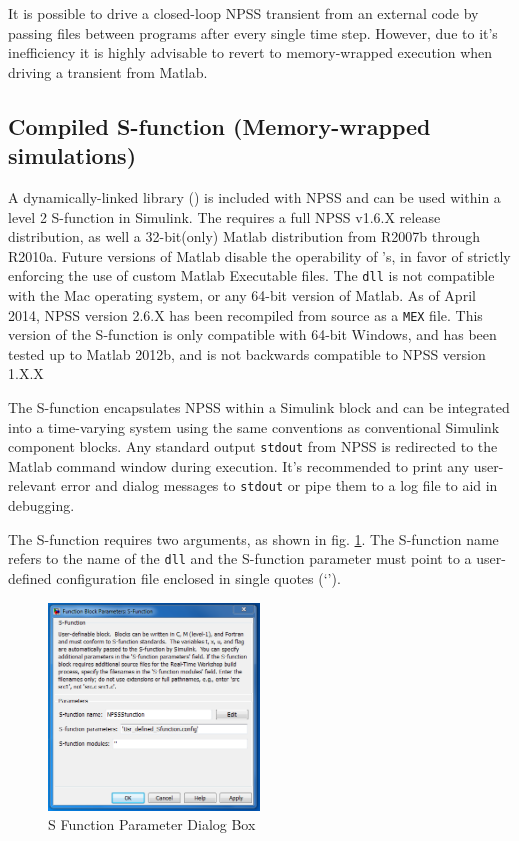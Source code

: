 \documentclass[heading.tex]{subfiles}
\begin{document}
It is possible to drive a closed-loop NPSS transient from an external code
by passing files between programs after every single time step.
However, due to it's inefficiency it is highly advisable to revert to
memory-wrapped execution when driving a transient from Matlab.

\subsection{Compiled S-function (Memory-wrapped simulations)}

A dynamically-linked library () is included with NPSS
and can be used within a level 2 S-function in Simulink.
The  requires a full NPSS v1.6.X release distribution,
as well a 32-bit(only) Matlab distribution from R2007b through R2010a.
Future versions of Matlab disable the operability of 's,
in favor of strictly enforcing the use of custom Matlab Executable  files.
The \texttt{dll} is not compatible with the Mac operating system, or any 64-bit version
of Matlab. As of April 2014, NPSS version 2.6.X has been recompiled from source as a \texttt{MEX} file.
This version of the S-function is only compatible with 64-bit Windows, and has been tested up to Matlab 2012b,
and is not backwards compatible to NPSS version 1.X.X

The S-function encapsulates NPSS within a Simulink block and can be integrated into a time-varying
system using the same conventions as conventional Simulink component blocks.
Any standard output \texttt{stdout} from NPSS is redirected to the Matlab command window during execution. 
It's recommended to print any user-relevant error and dialog messages to \texttt{stdout}
or pipe them to a log file to aid in debugging.

The S-function requires two arguments, as shown in fig. \ref{f:DialogBox}.
The S-function name refers to the name of the \texttt{dll} and the S-function parameter must point
to a user-defined configuration file enclosed in single quotes (`').

\begin{figure}[H]
\centering
\includegraphics[width=0.5\textwidth]{images/SFuncDialog}
\caption{S Function Parameter Dialog Box}
\label{f:DialogBox}
\end{figure}
\end{document}
